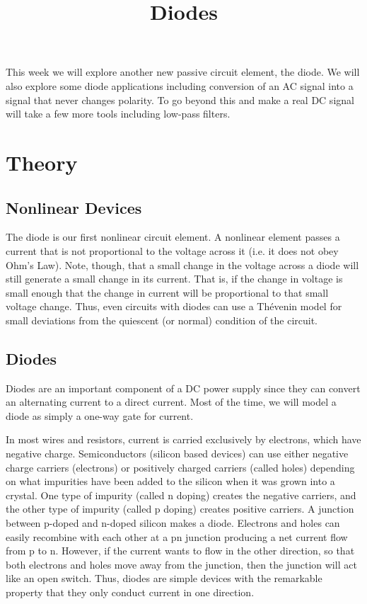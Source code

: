 \documentclass{article}
\title{Diodes}
\begin{document}
\maketitle

This week we will explore another new passive circuit element, the diode. We will also explore some diode applications including conversion of an AC signal into a signal that never changes polarity. To go beyond this and make a real DC signal will take a few more tools including low-pass filters. 

\section{Theory}

\subsection{Nonlinear Devices}
The diode is our first nonlinear circuit element. A nonlinear element passes a current that is not proportional to the voltage across it (i.e. it does not obey Ohm's Law). Note, though, that a small change in the voltage across a diode will still generate a small change in its current. That is, if the change in voltage is small enough that the change in current will be proportional to that small voltage change. Thus, even circuits with diodes can use a Th\'{e}venin model for small deviations from the quiescent (or normal) condition of the circuit. 

\subsection{Diodes}
Diodes are an important component of a DC power supply since they can convert an alternating current to a direct current. Most of the time, we will model a diode as simply a one-way gate for current. 

In most wires and resistors, current is carried exclusively by electrons, which have negative charge. Semiconductors (silicon based devices) can use either negative charge carriers (electrons) or positively charged carriers (called holes) depending on what impurities have been added to the silicon when it was grown into a crystal. One type of impurity (called n doping) creates the negative carriers, and the other type of impurity (called p doping) creates positive carriers. A junction between p-doped and n-doped silicon makes a diode. Electrons and holes can easily recombine with each other at a pn junction producing a net current flow from p to n. However, if the current wants to flow in the other direction, so that both electrons and holes move away from the junction, then the junction will act like an open switch. Thus, diodes are simple devices with the remarkable property that they only conduct current in one direction.
\end{document}

